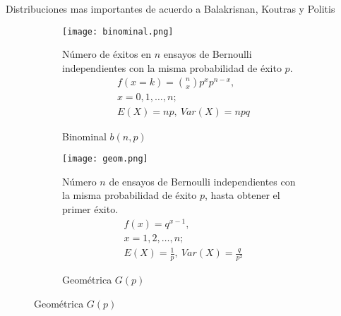 Distribuciones mas importantes de acuerdo a Balakrisnan, Koutras y Politis\cite{bala20}
\begin{figure}[H]
	\begin{subfigure}[t]{.475\textwidth}
		\texttt{[image: binominal.png]}\caption{Binominal $b(n,p)$}
Número de éxitos en $n$ ensayos de Bernoulli independientes con la misma probabilidad de éxito $p$.
		\begin{equation}
		\begin{matrix}
		f(x=k)=\binom{n}{x}p^xp^{n-x},\\
		x=0,1,\ldots,n;\\
		E(X)=np,\ Var(X)=npq
		\end{matrix}
		\end{equation}
	\end{subfigure}\qquad
\begin{subfigure}[t]{.475\textwidth}
		\texttt{[image: geom.png]}\caption{Geométrica $G(p)$}
		Número $n$ de ensayos de Bernoulli independientes con la misma probabilidad de éxito $p$, hasta obtener el primer éxito.
		\begin{equation}
		\begin{matrix}
		f(x)=q^{x-1},\\
		x=1,2,\ldots,n;\\
		E(X)=\frac{1}{p},\ Var(X)=\frac{q}{p^2}
		\end{matrix}
		\end{equation}
	\end{subfigure}
\end{figure}

